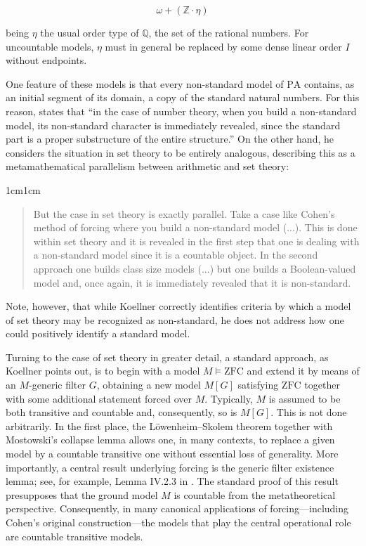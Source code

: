 \documentclass[11pt,a4paper]{article}
\theoremstyle{plain}
\begin{document}
$$\omega + (\mathbb{Z} \cdot \eta) $$

being $\eta$ the usual order type of $\mathbb{Q}$, the set of the rational numbers. For uncountable models, $\eta$ must in general be replaced by some dense linear order $I$ without endpoints.

One feature of these models is that every non-standard model of $\mathrm{PA}$ contains, as an initial segment of its domain, a copy of the standard natural numbers. For this reason, \textcite[p.~512]{Koellner2016} states that “in the case of number theory, when you build a non-standard model, its non-standard character is immediately revealed, since the standard part is a proper substructure of the entire structure.” On the other hand, he considers the situation in set theory to be entirely analogous, describing this as a metamathematical parallelism between arithmetic and set theory:

\begin{adjustwidth}{1cm}{1cm}
\begin{quote}
\small
But the case in set theory is exactly parallel. Take a case like Cohen's method of forcing where you build a non-standard model (...). This is done within set theory and it is revealed in the first step that one is dealing with a non-standard model since it is a countable object. In the second approach one builds class size models (...) but one builds a Boolean-valued model and, once again, it is immediately revealed that it is non-standard.
\end{quote}
\end{adjustwidth}

Note, however, that while Koellner correctly identifies criteria by which a model of set theory may be recognized as non-standard, he does not address how one could positively identify a standard model.

Turning to the case of set theory in greater detail, a standard approach, as Koellner points out, is to begin with a model \(M \models \mathrm{ZFC}\) and extend it by means of an \(M\)-generic filter \(G\), obtaining a new model \(M[G]\) satisfying \(\mathrm{ZFC}\) together with some additional statement forced over \(M\). Typically, \(M\) is assumed to be both transitive and countable and, consequently, so is \(M[G]\). This is not done arbitrarily. In the first place, the Löwenheim--Skolem theorem together with Mostowski's collapse lemma allows one, in many contexts, to replace a given model by a countable transitive one without essential loss of generality. More importantly, a central result underlying forcing is the generic filter existence lemma; see, for example, Lemma IV.2.3 in \textcite[p.~246]{Kunen2011}. The standard proof of this result presupposes that the ground model \(M\) is countable from the metatheoretical perspective. Consequently, in many canonical applications of forcing---including Cohen's original construction---the models that play the central operational role are countable transitive models.
\end{document}
